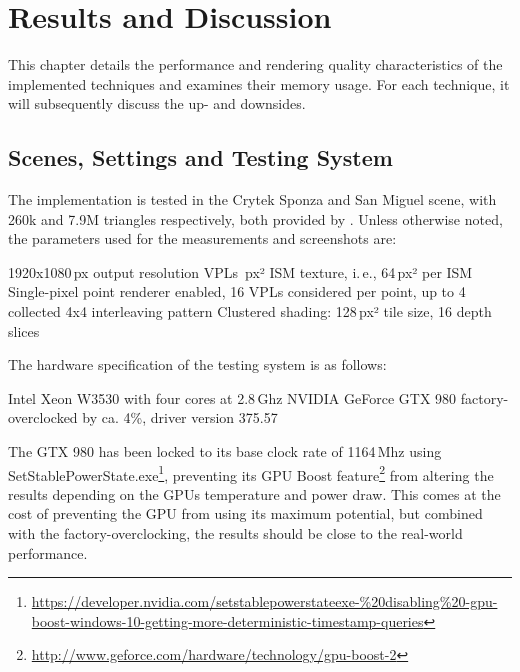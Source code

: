

\chapter{Results and Discussion}
\label{chap:results}

This chapter details the performance and rendering quality characteristics of the implemented techniques and examines their memory usage. For each technique, it will subsequently discuss the up- and downsides.

\section{Scenes, Settings and Testing System}
\label{sec:results:settings}

The implementation is tested in the Crytek Sponza and San Miguel scene, with 260k and 7.9M triangles respectively, both provided by \citet{McGuire2011Data}. Unless otherwise noted, the parameters used for the measurements and screenshots are:

\begin{outline}
    \1 1920x1080\,px output resolution
     VPLs
    \,px² ISM texture, i.\,e., 64\,px² per ISM
    \1 Single-pixel point renderer enabled, 16 VPLs considered per point, up to 4 collected
    \1 4x4 interleaving pattern
    \1 Clustered shading: 128\,px² tile size, 16 depth slices
\end{outline}

\noindent
The hardware specification of the testing system is as follows:

\begin{outline}
    \1 Intel Xeon W3530 with four cores at 2.8\,Ghz
    \1 NVIDIA GeForce GTX 980 factory-overclocked by ca. 4\%, driver version 375.57
\end{outline}

The GTX 980 has been locked to its base clock rate of 1164\,Mhz using SetStablePowerState.exe\footnote{\url{https://developer.nvidia.com/setstablepowerstateexe-\%20disabling\%20-gpu-boost-windows-10-getting-more-deterministic-timestamp-queries}}, preventing its GPU Boost feature\footnote{\url{http://www.geforce.com/hardware/technology/gpu-boost-2}} from altering the results depending on the GPUs temperature and power draw. This comes at the cost of preventing the GPU from using its maximum potential, but combined with the factory-overclocking, the results should be close to the real-world performance.

